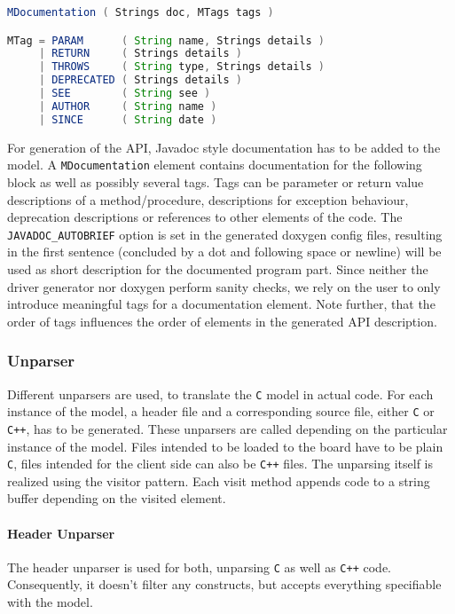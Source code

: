 \documentclass{report}
\begin{document}
\begin{lstlisting}[language=java, breaklines=true]
MDocumentation ( Strings doc, MTags tags )

MTag = PARAM      ( String name, Strings details )
     | RETURN     ( Strings details )
     | THROWS     ( String type, Strings details )
     | DEPRECATED ( Strings details ) 
     | SEE        ( String see )
     | AUTHOR     ( String name )
     | SINCE      ( String date )
\end{lstlisting}

For generation of the API, Javadoc style documentation has to be added to the model. A \texttt{MDocumentation} element contains documentation for the following block as well as possibly several tags. Tags can be parameter or return value descriptions of a method/procedure, descriptions for exception behaviour, deprecation descriptions or references to other elements of the code. The \texttt{JAVADOC\_AUTOBRIEF} option is set in the generated doxygen config files, resulting in the first sentence (concluded by a dot and following space or newline) will be used as short description for the documented program part. Since neither the driver generator nor doxygen perform sanity checks, we rely on the user to only introduce meaningful tags for a documentation element. Note further, that the order of tags influences the order of elements in the generated API description.

\subsubsection{Unparser}
\label{sec:gen:unparser}
Different unparsers are used, to translate the \texttt{C} model in actual code. For each instance of the model, a header file and a corresponding source file, either \texttt{C} or \texttt{C++}, has to be generated. These unparsers are called depending on the particular instance of the model. Files intended to be loaded to the board have to be plain \texttt{C}, files intended for the client side can also be \texttt{C++} files. The unparsing itself is realized using the visitor pattern. Each visit method appends code to a string buffer depending on the visited element.

\paragraph{Header Unparser}
The header unparser is used for both, unparsing \texttt{C} as well as \texttt{C++} code. Consequently, it doesn't filter any constructs, but accepts everything specifiable with the model.
\end{document}
